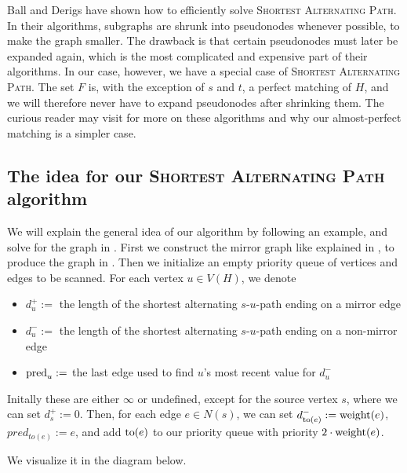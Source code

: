 Ball and Derigs \cite{source:shortest_alternating_path} have shown how to efficiently solve \textsc{Shortest Alternating Path}. In their algorithms, subgraphs are shrunk into pseudonodes whenever possible, to make the graph smaller. The drawback is that certain pseudonodes must later be expanded again, which is the most complicated and expensive part of their algorithms. In our case, however, we have a special case of \textsc{Shortest Alternating Path}. The set $F$ is, with the exception of $s$ and $t$, a perfect matching of $H$, and we will therefore never have to expand pseudonodes after shrinking them. The curious reader may visit \cite{source:shortest_alternating_path} for more on these algorithms and why our almost-perfect matching is a simpler case.

\subsection{The idea for our \textsc{Shortest Alternating Path} algorithm}
We will explain the general idea of our algorithm by following an example, and solve for the graph in . First we construct the mirror graph like explained in , to produce the graph in . Then we initialize an empty priority queue of vertices and edges to be scanned. For each vertex $u \in V(H)$, we denote
\begin{itemize}
    \item $d^+_u :=$ the length of the shortest alternating $s$-$u$-path ending on a mirror edge
    \item $d^-_u :=$ the length of the shortest alternating $s$-$u$-path ending on a non-mirror edge
    \item $\operatorname{pred}_u :=$ the last edge used to find $u$'s most recent value for $d^-_u$
\end{itemize}

Initally these are either $\infty$ or undefined, except for the source vertex $s$, where we can set $d^+_s := 0$. Then, for each edge $e \in N(s)$, we can set $d^-_{\operatorname{to}(e)} := \operatorname{weight}(e)$, $pred_{to(e)} := e$, and add $\operatorname{to}(e)$ to our priority queue with priority $2 \cdot \operatorname{weight}(e)$.

We visualize it in the diagram below.

